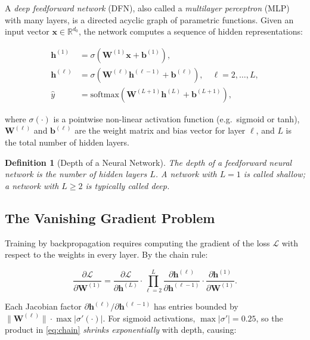 \documentclass[12pt,a4paper]{article}
\newtheorem{definition}{Definition}[section]
\newcommand{\W}{\mathbf{W}}
\newcommand{\x}{\mathbf{x}}
\newcommand{\h}{\mathbf{h}}
\newcommand{\loss}{\mathcal{L}}
\begin{document}
A \emph{deep feedforward network} (DFN), also called a \emph{multilayer
perceptron} (MLP) with many layers, is a directed acyclic graph of parametric
functions.  Given an input vector $\x \in \mathbb{R}^{d_0}$, the network
computes a sequence of hidden representations:

\begin{align}
  \h^{(1)} &= \sigma\!\left(\W^{(1)}\x + \mathbf{b}^{(1)}\right), \label{eq:h1} \\
  \h^{(\ell)} &= \sigma\!\left(\W^{(\ell)}\h^{(\ell-1)} + \mathbf{b}^{(\ell)}\right),
               \quad \ell = 2, \ldots, L, \label{eq:hl} \\
  \hat{y} &= \text{softmax}\!\left(\W^{(L+1)}\h^{(L)} + \mathbf{b}^{(L+1)}\right), \label{eq:yhat}
\end{align}

where $\sigma(\cdot)$ is a pointwise non-linear activation function
(e.g.\ sigmoid or tanh), $\W^{(\ell)}$ and $\mathbf{b}^{(\ell)}$ are the
weight matrix and bias vector for layer $\ell$, and $L$ is the total number
of hidden layers.

\begin{definition}[Depth of a Neural Network]
\label{def:depth}
  The \emph{depth} of a feedforward neural network is the number of
  \emph{hidden} layers $L$.  A network with $L = 1$ is called \emph{shallow};
  a network with $L \geq 2$ is typically called \emph{deep}.
\end{definition}

\subsection{The Vanishing Gradient Problem}

Training by backpropagation requires computing the gradient of the loss
$\loss$ with respect to the weights in every layer.  By the chain rule:

\begin{equation}
  \frac{\partial \loss}{\partial \W^{(1)}} =
  \frac{\partial \loss}{\partial \h^{(L)}} \cdot
  \prod_{\ell=2}^{L} \frac{\partial \h^{(\ell)}}{\partial \h^{(\ell-1)}} \cdot
  \frac{\partial \h^{(1)}}{\partial \W^{(1)}}.
  \label{eq:chain}
\end{equation}

Each Jacobian factor $\partial \h^{(\ell)}/\partial \h^{(\ell-1)}$ has entries
bounded by $\|\W^{(\ell)}\| \cdot \max|\sigma'(\cdot)|$.  For sigmoid
activations, $\max|\sigma'| = 0.25$, so the product in \cref{eq:chain}
\emph{shrinks exponentially} with depth, causing:
\end{document}
